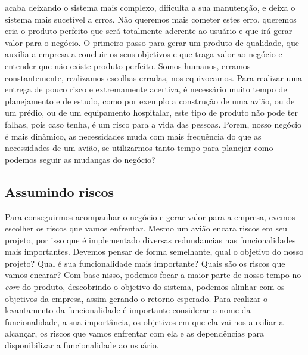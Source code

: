     acaba deixando o sistema mais complexo, dificulta a sua manutenção, e deixa o
    sistema mais sucetível a erros. \newline
    Não queremos mais cometer estes erro, queremos cria o produto perfeito que
    será totalmente aderente ao usuário e que irá gerar valor para o negócio. \newline
    O primeiro passo para gerar um produto de qualidade, que auxilia a empresa a
    concluir os seus objetivos e que traga valor ao negócio e entender que não
    existe produto perfeito. Somos humanos, erramos constantemente, realizamos
    escolhas erradas, nos equivocamos. Para realizar uma entrega de pouco risco
    e extremamente acertiva, é necessário muito tempo de planejamento e de estudo,
    como por exemplo a construção de uma avião, ou de um prédio, ou de um
    equipamento hospitalar, este tipo de produto não pode ter falhas, pois caso
    tenha, é um risco para a vida das pessoas. Porem, nosso negócio é mais
    dinâmico, as necessidades muda com mais frequência do que as necessidades de
    um avião, se utilizarmos tanto tempo para planejar como podemos seguir as
    mudanças do negócio?

    \subsection{Assumindo riscos}
    Para conseguirmos acompanhar o negócio e gerar valor para a empresa, evemos
    escolher os riscos que vamos enfrentar. Mesmo um avião encara riscos em seu
    projeto, por isso que é implementado diversas redundancias nas funcionalidades
    mais importantes. Devemos pensar de forma semelhante, qual o objetivo do nosso
    projeto? Qual é sua funcionalidade mais importante? Quais são os riscos que
    vamos encarar? \newline
    Com base nisso, podemos focar a maior parte de nosso tempo no \textit{core}
    do produto, descobrindo o objetivo do sistema, podemos alinhar com os objetivos
    da empresa, assim gerando o retorno esperado. Para realizar o levantamento
    da funcionalidade é importante considerar o nome da funcionalidade, a sua
    importância, os objetivos em que ela vai nos auxiliar a alcançar, os riscos
    que vamos enfrentar com ela e as dependências para disponibilizar a
    funcionalidade ao usuário.


